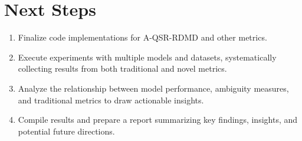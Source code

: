 \documentclass{article}
\begin{document}
\section{Next Steps}
\begin{enumerate}
    \item Finalize code implementations for A-QSR-RDMD and other metrics.
    \item Execute experiments with multiple models and datasets, systematically collecting results from both traditional and novel metrics.
    \item Analyze the relationship between model performance, ambiguity measures, and traditional metrics to draw actionable insights.
    \item Compile results and prepare a report summarizing key findings, insights, and potential future directions.
\end{enumerate}
\end{document}
